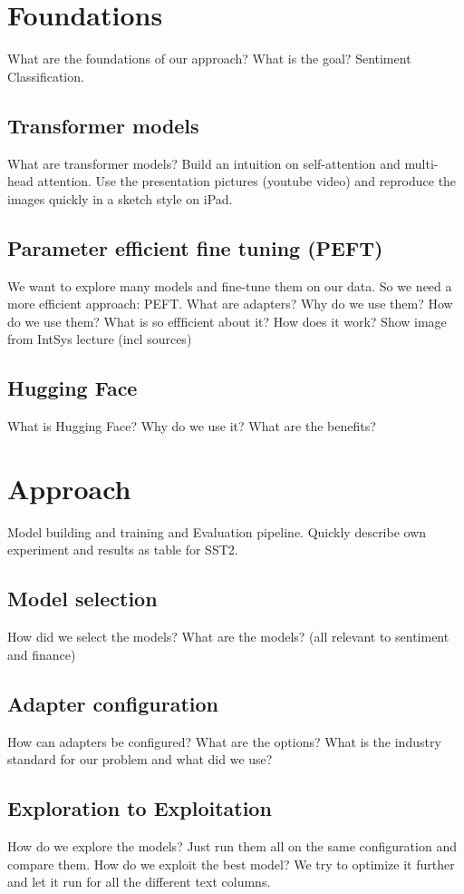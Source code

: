 \documentclass[conference]{IEEEtran}
\begin{document}
\section{Foundations} %
What are the foundations of our approach? What is the goal? Sentiment Classification.
\subsection{Transformer models}%
What are transformer models? 
Build an intuition on self-attention and multi-head attention. 
Use the presentation pictures (youtube video) and reproduce the images quickly in a sketch style on iPad.
\subsection{Parameter efficient fine tuning (PEFT)}%
We want to explore many models and fine-tune them on our data. So we need a more efficient approach: PEFT.
What are adapters? Why do we use them? How do we use them?
What is so effficient about it? How does it work?
Show image from IntSys lecture (incl sources)
\subsection{Hugging Face}%
What is Hugging Face? Why do we use it? What are the benefits?


\section{Approach}%
Model building and training and Evaluation pipeline.
Quickly describe own experiment and results as table for SST2.

\subsection{Model selection}%
How did we select the models? What are the models?
(all relevant to sentiment and finance)
\subsection{Adapter configuration}%
How can adapters be configured? What are the options? What is the industry standard for our problem and what did we use?
\subsection{Exploration to Exploitation}%
How do we explore the models? Just run them all on the same configuration and compare them.
How do we exploit the best model? We try to optimize it further and let it run for all the different text columns.
\end{document}
